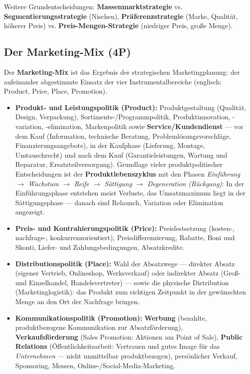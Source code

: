 \documentclass[11pt, a4paper]{article}
\begin{document}
Weitere Grundentscheidungen: \textbf{Massenmarktstrategie} vs.
\textbf{Segmentierungsstrategie} (Nischen), \textbf{Präferenzstrategie} (Marke, Qualität,
höherer Preis) vs. \textbf{Preis-Mengen-Strategie} (niedriger Preis, große Menge).

\subsection{Der Marketing-Mix (4P)}

Der \textbf{Marketing-Mix} ist das Ergebnis der strategischen Marketingplanung: der
aufeinander abgestimmte Einsatz der vier Instrumentalbereiche (englisch: Product, Price,
Place, Promotion).

\begin{itemize}
  \item \textbf{Produkt- und Leistungspolitik (Product):} Produktgestaltung (Qualität,
    Design, Verpackung), Sortiments-/Programmpolitik, Produktinnovation, -variation,
    -elimination, Markenpolitik sowie \textbf{Service/Kundendienst} --- vor dem Kauf
    (Information, technische Beratung, Problemlösungsvorschläge, Finanzierungsangebote),
    in der Kaufphase (Lieferung, Montage, Umtauschrecht) und nach dem Kauf
    (Garantieleistungen, Wartung und Reparatur, Ersatzteilversorgung). Grundlage vieler
    produktpolitischer Entscheidungen ist der \textbf{Produktlebenszyklus} mit den Phasen
    \emph{Einführung $\rightarrow$ Wachstum $\rightarrow$ Reife $\rightarrow$ Sättigung
    $\rightarrow$ Degeneration (Rückgang)}: In der Einführungsphase entstehen meist
    Verluste, das Umsatzmaximum liegt in der Sättigungsphase --- danach sind Relaunch,
    Variation oder Elimination angezeigt.
  \item \textbf{Preis- und Kontrahierungspolitik (Price):} Preisfestsetzung
    (kosten-, nachfrage-, konkurrenzorientiert), Preisdifferenzierung, Rabatte, Boni und
    Skonti, Liefer- und Zahlungsbedingungen, Absatzkredite.
  \item \textbf{Distributionspolitik (Place):} Wahl der Absatzwege --- direkter Absatz
    (eigener Vertrieb, Onlineshop, Werksverkauf) oder indirekter Absatz (Groß- und
    Einzelhandel, Handelsvertreter) --- sowie die physische Distribution
    (Marketinglogistik): das Produkt zum richtigen Zeitpunkt in der gewünschten Menge an
    den Ort der Nachfrage bringen.
  \item \textbf{Kommunikationspolitik (Promotion):} \textbf{Werbung} (bezahlte,
    produktbezogene Kommunikation zur Absatzförderung), \textbf{Verkaufsförderung}
    (Sales Promotion: Aktionen am Point of Sale), \textbf{Public Relations}
    (Öffentlichkeitsarbeit: Vertrauen und gutes Image für das \emph{Unternehmen} ---
    nicht unmittelbar produktbezogen), persönlicher Verkauf, Sponsoring, Messen,
    Online-/Social-Media-Marketing.
\end{itemize}
\end{document}
